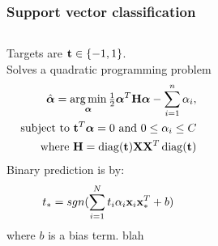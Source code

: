 \begin{frame}
\frametitle{Support vector classification}
\begin{columns}[c]
Targets are ${\bf t} \in \{-1,1\}$.\\
Solves a quadratic programming problem
\begin{align*}
\hat{\boldsymbol\alpha} = \operatorname*{arg\,min}_{\boldsymbol\alpha} \tfrac{1}{2} {\boldsymbol\alpha}^T {\bf H}{\boldsymbol\alpha} - \sum_{i=1}^n \alpha_i,\\
\text{subject to }
{\bf t}^T{\boldsymbol\alpha} = 0 \text{ and }
0 \le \alpha_i \le C\\
\text{where }
{\bf H} = \operatorname{diag}({\bf t}) {\bf X}{\bf X}^T \operatorname{diag}({\bf t})
\end{align*}
Binary prediction is by:
\begin{align*}
t_* = sgn(\sum_{i=1}^N t_i \alpha_i {\bf x}_i {\bf x}_*^T + b)
\end{align*}
where $b$ is a bias term.
blah
\end{columns}
\end{frame}
